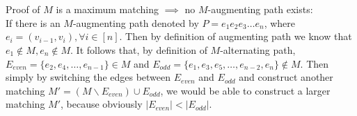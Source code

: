 \documentclass[12pt,letterpaper]{article}
\begin{document}
\section{}
\subsection{}
Proof of $M$ is a maximum matching $\implies$ no $M$-augmenting path exists:\\
If there is an $M$-augmenting path denoted by $P=e_1e_2e_3\dots e_n$,
where $e_i=(v_{i-1},v_i), \forall i\in [n]$.
Then by definition of augmenting path we know that $e_1\notin M, e_n\notin M$.
It follows that, by definition of $M$-alternating path, 
$E_{even}=\{e_2,e_4,\dots,e_{n-1}\}\in M$
and $E_{odd}=\{e_1,e_3,e_5,\dots,e_{n-2},e_{n}\}\notin M$.
Then simply by switching the edges between $E_{even}$ and $E_{odd}$
and construct another matching $M'=(M\backslash E_{even})\cup E_{odd}$,
we would be able to construct a larger matching $M'$,
because obviously $|E_{even}|<|E_{odd}|$.\\
\end{document}
